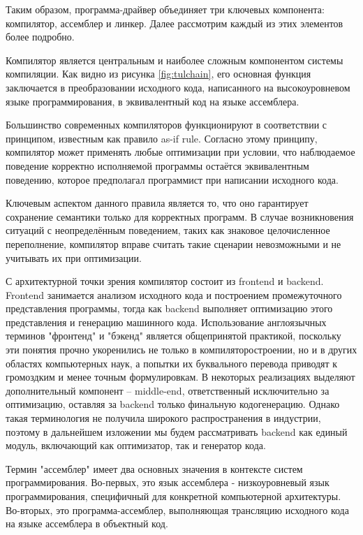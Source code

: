 Таким образом, программа-драйвер объединяет три ключевых компонента: компилятор, ассемблер и линкер. Далее рассмотрим каждый из этих элементов более подробно.

Компилятор является центральным и наиболее сложным компонентом системы компиляции. Как видно из рисунка \ref{fig:tulchain}, его основная функция заключается в преобразовании исходного кода, написанного на высокоуровневом языке программирования, в эквивалентный код на языке ассемблера. 

Большинство современных компиляторов функционируют в соответствии с принципом, известным как правило as-if rule. Согласно этому принципу, компилятор может применять любые оптимизации при условии, что наблюдаемое поведение корректно исполняемой программы остаётся эквивалентным поведению, которое предполагал программист при написании исходного кода.

Ключевым аспектом данного правила является то, что оно гарантирует сохранение семантики только для корректных программ. В случае возникновения ситуаций с неопределённым поведением, таких как знаковое целочисленное переполнение, компилятор вправе считать такие сценарии невозможными и не учитывать их при оптимизации.

С архитектурной точки зрения компилятор состоит из frontend и backend. Frontend занимается анализом исходного кода и построением промежуточного представления программы, тогда как backend выполняет оптимизацию этого представления и генерацию машинного кода. Использование англоязычных терминов "фронтенд" и "бэкенд" является общепринятой практикой, поскольку эти понятия прочно укоренились не только в компиляторостроении, но и в других областях компьютерных наук, а попытки их буквального перевода приводят к громоздким и менее точным формулировкам. В некоторых реализациях выделяют дополнительный компонент -- middle-end, ответственный исключительно за оптимизацию, оставляя за backend только финальную кодогенерацию. Однако такая терминология не получила широкого распространения в индустрии, поэтому в дальнейшем изложении мы будем рассматривать backend как единый модуль, включающий как оптимизатор, так и генератор кода.

Термин "ассемблер" имеет два основных значения в контексте систем программирования. Во-первых, это язык ассемблера - низкоуровневый язык программирования, специфичный для конкретной компьютерной архитектуры. Во-вторых, это программа-ассемблер, выполняющая трансляцию исходного кода на языке ассемблера в объектный код.

